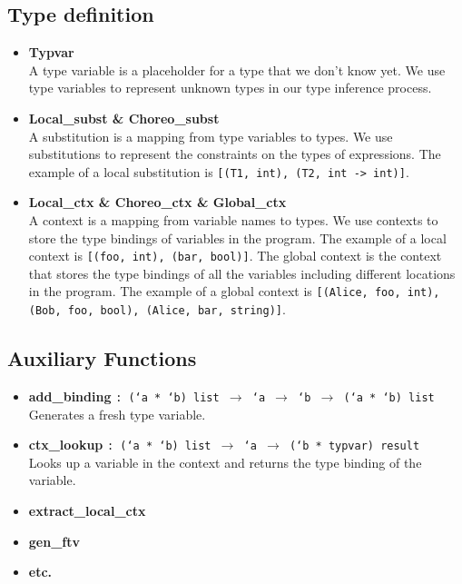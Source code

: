 \documentclass{article}
\begin{document}
\subsection{Type definition}
    \begin{itemize}
        \item \textbf{Typvar} \\
              A type variable is a placeholder for a type that we don't know yet. We use type variables to represent unknown types in our type inference process.
        \item \textbf{Local\_subst \& Choreo\_subst} \\
              A substitution is a mapping from type variables to types. We use substitutions to represent the constraints on the types of expressions. The example of a local substitution is \texttt{[(T1, int), (T2, int -> int)]}.
        \item \textbf{Local\_ctx \& Choreo\_ctx \& Global\_ctx} \\
              A context is a mapping from variable names to types. We use contexts to store the type bindings of variables in the program. The example of a local context is \texttt{[(foo, int), (bar, bool)]}. The global context is the context that stores the type bindings of all the variables including different locations in the program. The example of a global context is \texttt{[(Alice, foo, int), (Bob, foo, bool), (Alice, bar, string)]}.
    \end{itemize}

\subsection{Auxiliary Functions}
    \begin{itemize}
        \item \textbf{add\_binding} \texttt{: (`a * `b) list $\to$ `a $\to$ `b $\to$ (`a * `b) list} \\
              Generates a fresh type variable.
        \item \textbf{ctx\_lookup} \texttt{: (`a * `b) list $\to$ `a $\to$ (`b * typvar) result} \\
              Looks up a variable in the context and returns the type binding of the variable.
        \item \textbf{extract\_local\_ctx}
        \item \textbf{gen\_ftv}
        \item \textbf{etc.}
    \end{itemize}
\end{document}
